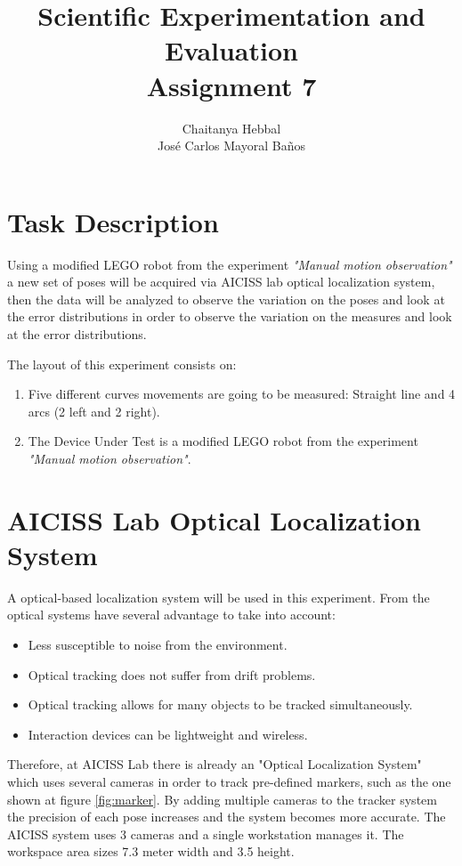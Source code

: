 \documentclass[10pt]{scrartcl}
\title{Scientific Experimentation and Evaluation\\
		\small{Assignment 7}}
\author{Chaitanya Hebbal\\
		Jos\'e Carlos Mayoral Ba\~nos}
\begin{document}
	\maketitle
\section*{Task Description}

Using a modified LEGO robot from the experiment \textit{"Manual motion observation"} a new set of poses will be acquired via AICISS lab optical localization system, then the data will be analyzed to observe the variation on the poses and look at the error distributions in order to observe the variation on the measures and look at the error distributions.

The layout of this experiment consists on:
\begin{enumerate}
	\item Five different curves movements are going to be measured: Straight line and 4 arcs (2 left and 2 right).
	\item The Device Under Test is a modified LEGO robot from the experiment \textit{"Manual motion observation"}.
\end{enumerate}

\section*{AICISS Lab Optical Localization System}

A optical-based localization system will be used in this experiment. From \cite{OptSystem} the optical systems have several advantage to take into account:

\begin{itemize}
\item Less susceptible to noise from the environment. 
\item Optical tracking does not suffer from drift problems.
\item Optical tracking allows for many objects to be tracked simultaneously.
\item Interaction devices can be lightweight and wireless. 
\end{itemize}



Therefore, at AICISS Lab there is already an "Optical Localization System" which uses several cameras in order to track pre-defined markers, such as the one shown at figure \ref{fig:marker}. By adding multiple cameras to the tracker system the precision of each pose increases and the system becomes more accurate. The AICISS system uses 3 cameras and a single workstation manages it. The workspace area sizes 7.3 meter width and 3.5 height.
\end{document}
